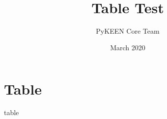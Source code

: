 \documentclass{article}
\title{Table Test}
\author{PyKEEN Core Team}
\date{March 2020}
\begin{document}
    \maketitle
    \section{Table}
    \label{sec:introduction}
    {{ table }}
\end{document}

